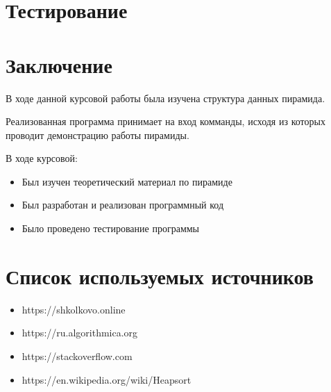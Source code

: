 \documentclass{article}
\begin{document}
\newpage

\section{Тестирование}


\newpage

\section{Заключение}

В ходе данной курсовой работы была изучена структура данных пирамида.

Реализованная программа принимает на вход комманды, исходя из которых проводит демонстрацию работы пирамиды.

В ходе курсовой:
\begin{itemize}
    \item Был изучен теоретический материал по пирамиде
    \item Был разработан и реализован программный код
    \item Было проведено тестирование программы
\end{itemize}

\newpage

\section{Список используемых источников}

\begin{itemize}
    \item https://shkolkovo.online
    \item https://ru.algorithmica.org
    \item https://stackoverflow.com
    \item https://en.wikipedia.org/wiki/Heapsort
\end{itemize}
\end{document}

